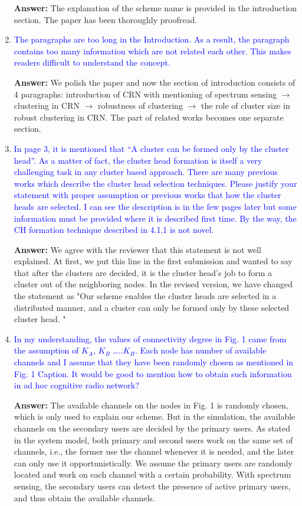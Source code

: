 \documentclass[10pt,a4paper]{article}
\begin{document}
\begin{enumerate}
    \textbf{Answer:} The explanation of the scheme name is provided in the introduction section.
    The paper has been thoroughly proofread.
    
\item \textcolor{blue}{  The paragraphs are too long in the Introduction. As a result, the paragraph contains too many information which are not related each other. This makes readers difficult to understand the concept.}
    
    \textbf{Answer:} We polish the paper and now the section of introduction consists of 4 paragraphs: introduction of CRN with mentioning of spectrum sensing $\rightarrow$ clustering in CRN $\rightarrow$ robustness of clustering $\rightarrow$ the role of cluster size in robust clustering in CRN.
    The part of related works becomes one separate section.
    
\item \textcolor{blue}{   In page 3, it is mentioned that “A cluster can be formed only by the cluster head”. As a matter of fact, the cluster head formation is itself a very challenging task in any cluster based approach. There are many previous works which describe the cluster head selection techniques. Please justify your statement with proper assumption or previous works that how the cluster heads are selected. I can see the description is in the few pages later but some information must be provided where it is described first time. By the way, the CH formation technique described in 4.1.1 is not novel.}

\textbf{Answer:} We agree with the reviewer that this statement is not well explained.
	    At first, we put this line in the first submission and wanted to say that after the clusters are decided, it is the cluster head's job to form a cluster out of the neighboring nodes.
In the revised version, we have changed the statement as "Our scheme enables the cluster heads are selected in a distributed manner, and a cluster can only be formed only by these selected cluster head. "
    
\item \textcolor{blue}{  In my understanding, the values of connectivity degree in Fig. 1 came from the assumption of $K_A$, $K_B$ …..$K_H$. Each node has number of available channels and I assume that they have been randomly chosen as mentioned in Fig. 1 Caption. It would be good to mention how to obtain such information in ad hoc cognitive radio network?}

\textbf{Answer:} 
The available channels on the nodes in Fig. 1 is randomly chosen, which is only used to explain our scheme.
But in the simulation, the available channels on the secondary users are decided by the primary users.
As stated in the system model, both primary and second users work on the same set of channels, i.e., the former use the channel whenever it is needed, and the later can only use it opportunistically.
    We assume the primary users are randomly located and work on each channel with a certain probability.
    With spectrum sensing, the secondary users can detect the presence of active primary users, and thus obtain the available channels.
    

\end{enumerate}
\end{document}
